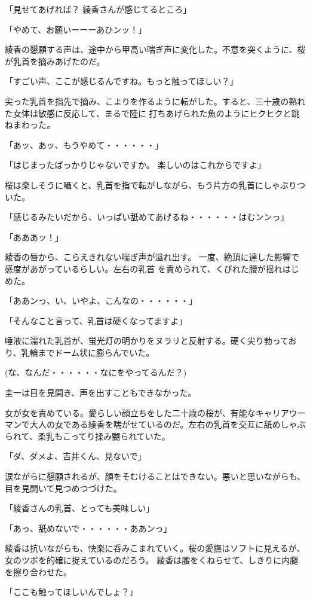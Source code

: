 ﻿\documentclass[book,tate]{jlreq}
\begin{document}
「見せてあげれば？ 綾香さんが感じてるところ」

「やめて、お願いーーーあひンッ！」

綾香の懇願する声は、途中から甲高い喘ぎ声に変化した。不意を突くように、桜が乳首を摘みあげたのだ。

「すごい声、ここが感じるんですね。もっと触ってほしい？」

尖った乳首を指先で摘み、こよりを作るように転がした。すると、三十歳の熟れた女体は敏感に反応して、まるで陸に 打ちあげられた魚のようにヒクヒクと跳ねまわった。

「あッ、あッ、もうやめて・・・・・・」

「はじまったばっかりじゃないですか。 楽しいのはこれからですよ」

桜は楽しそうに囁くと、乳首を指で転がしながら、もう片方の乳首にしゃぶりついた。

「感じるみたいだから、いっぱい舐めてあげるね・・・・・・はむンンっ」

「あああッ！」

綾香の唇から、こらえきれない喘ぎ声が溢れ出す。 一度、絶頂に達した影響で感度があがっているらしい。左右の乳首 を責められて、くびれた腰が揺れはじめた。

「ああンっ、い、いやよ、こんなの・・・・・・」

「そんなこと言って、乳首は硬くなってますよ」

唾液に濡れた乳首が、蛍光灯の明かりをヌラリと反射する。硬く尖り勃っており、乳輪までドーム状に膨らんでいた。

(な、なんだ・・・・・・なにをやってるんだ？)

圭一は目を見開き、声を出すこともできなかった。

女が女を責めている。愛らしい顔立ちをした二十歳の桜が、有能なキャリアウーマンで大人の女である綾香を喘がせているのだ。左右の乳首を交互に舐めしゃぶられて、柔乳もこってり揉み嬲られていた。

「ダ、ダメよ、吉井くん、見ないで」

涙ながらに懇願されるが、顔をそむけることはできない。悪いと思いながらも、目を見開いて見つめつづけた。

「綾香さんの乳首、とっても美味しい」

「あっ、舐めないで・・・・・・ああンっ」

綾香は抗いながらも、快楽に呑みこまれていく。桜の愛撫はソフトに見えるが、女のツボを的確に捉えているのだろう。 綾香は腰をくねらせて、しきりに内腿を擦り合わせた。

「ここも触ってほしいんでしょ？」
\end{document}
